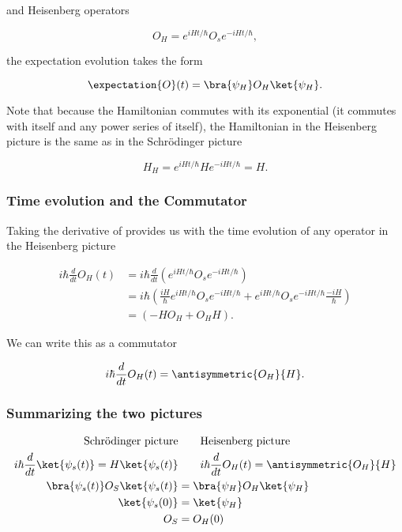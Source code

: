 and Heisenberg operators

\begin{equation}\label{eqn:qmTwoL5:320}
O_H = e^{i H t/\hbar} O_s e^{-i H t/\hbar},
\end{equation}

the expectation evolution takes the form

\begin{equation}\label{eqn:qmTwoL5:340}
\expectation{O}(t) = 
\bra{\psi_H} 
O_H
\ket{\psi_H}.
\end{equation}

Note that because the Hamiltonian commutes with its exponential (it commutes with itself and any power series of itself), the Hamiltonian in the Heisenberg picture is the same as in the Schr\"{o}dinger picture

\begin{equation}\label{eqn:qmTwoL5:360}
H_H = e^{i H t/\hbar} H e^{-i H t/\hbar} = H.
\end{equation}

\subsubsection{Time evolution and the Commutator}

Taking the derivative of  provides us with the time evolution of any operator in the Heisenberg picture

\begin{align*}
i \hbar \frac{d}{dt} O_H(t) 
&=
i \hbar \frac{d}{dt} \left( 
e^{i H t/\hbar} O_s e^{-i H t/\hbar}
\right) \\
&=
i \hbar \left( 
\frac{i H}{\hbar} e^{i H t/\hbar} O_s e^{-i H t/\hbar}
+
e^{i H t/\hbar} O_s e^{-i H t/\hbar} \frac{-i H}{\hbar} 
\right) \\
&=
\left( 
-H O_H
+
O_H H
\right).
\end{align*}

We can write this as a commutator

\begin{equation}\label{eqn:qmTwoL5:380}
i \hbar \frac{d}{dt} O_H(t) = \antisymmetric{O_H}{H}.
\end{equation}

\subsubsection{Summarizing the two pictures}

\begin{align*}
\text{Schr\"{o}dinger picture} &\qquad \text{Heisenberg picture} \\
i \hbar \frac{d}{dt} \ket{\psi_s(t)} = H \ket{\psi_s(t)} &\qquad i \hbar \frac{d}{dt} O_H(t) = \antisymmetric{O_H}{H} \\
\bra{\psi_s(t)} O_S \ket{\psi_s(t)} &= \bra{\psi_H} O_H \ket{\psi_H} \\
\ket{\psi_s(0)} &= \ket{\psi_H} \\
O_S &= O_H(0)
\end{align*}


